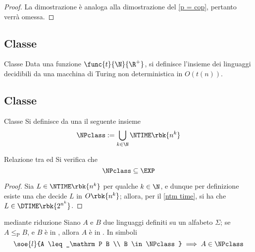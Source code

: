 \documentclass[a4paper, 12pt]{report}
\begin{document}
    \begin{proof}
        La dimostrazione è analoga alla dimostrazione del \cref{p = cop}, pertanto verrà omessa.
    \end{proof}

    \subsection{Classe \NTIME}

    \begin{frameddefn}{Classe \NTIME}
        Data una funzione $\func{t}{\N}{\R^+}$, si definisce  l'insieme dei linguaggi decidibili da una macchina di Turing non deterministica in $O(t(n))$.
    \end{frameddefn}

    \subsection{Classe \NPclass}
    
    \begin{frameddefn}[label={np def}]{Classe \NPclass}
        Si definisce  da una \NTM il seguente insieme $$\NPclass := \bigcup_{k \in \N}{\NTIME \rbk{n^k}}$$
    \end{frameddefn}

    \begin{framedprop}[label={np exp}]{Relazione tra \NPclass ed \EXP}
        Si verifica che $$\NPclass \subseteq \EXP$$
    \end{framedprop}

    \begin{proof}
        Sia $L \in \NTIME\rbk{n^k}$ per qualche $k \in \N$, e dunque per definizione esiste una \NTM che decide $L$ in $O\rbk{n^k}$; allora, per il \cref{ntm time}, si ha che $L \in \DTIME \rbk{2^{n^k}}$.
    \end{proof}

    \begin{framedthm}[label={np w red}]{\NPclass mediante riduzione}
        Siano $A$ e $B$ due linguaggi definiti su un alfabeto $\Sigma$; se $A \leq_\mathrm P B$, e $B$ è in \NPclass, allora $A$ è in \NPclass. In simboli $$\soe{l}{A \leq_\mathrm P B \\ B \in \NPclass} \implies A \in \NPclass$$
    \end{framedthm}
\end{document}
